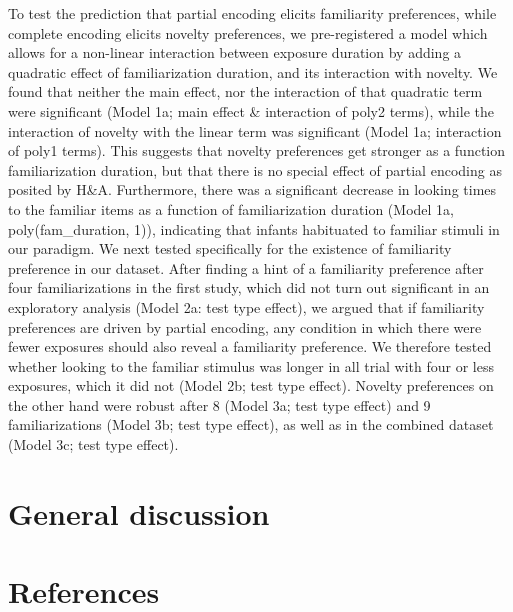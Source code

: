\documentclass[10pt, letterpaper]{article}
\begin{document}
To test the prediction that partial encoding elicits familiarity
preferences, while complete encoding elicits novelty preferences, we
pre-registered a model which allows for a non-linear interaction between
exposure duration by adding a quadratic effect of familiarization
duration, and its interaction with novelty. We found that neither the
main effect, nor the interaction of that quadratic term were significant
(Model 1a; main effect \& interaction of poly2 terms), while the
interaction of novelty with the linear term was significant (Model 1a;
interaction of poly1 terms). This suggests that novelty preferences get
stronger as a function familiarization duration, but that there is no
special effect of partial encoding as posited by H\&A. Furthermore,
there was a significant decrease in looking times to the familiar items
as a function of familiarization duration (Model 1a, poly(fam\_duration,
1)), indicating that infants habituated to familiar stimuli in our
paradigm. We next tested specifically for the existence of familiarity
preference in our dataset. After finding a hint of a familiarity
preference after four familiarizations in the first study, which did not
turn out significant in an exploratory analysis (Model 2a: test type
effect), we argued that if familiarity preferences are driven by partial
encoding, any condition in which there were fewer exposures should also
reveal a familiarity preference. We therefore tested whether looking to
the familiar stimulus was longer in all trial with four or less
exposures, which it did not (Model 2b; test type effect). Novelty
preferences on the other hand were robust after 8 (Model 3a; test type
effect) and 9 familiarizations (Model 3b; test type effect), as well as
in the combined dataset (Model 3c; test type effect).

\hypertarget{general-discussion}{%
\section{General discussion}\label{general-discussion}}

\hypertarget{references}{%
\section{References}\label{references}}

\setlength{\parindent}{-0.1in} 
\setlength{\leftskip}{0.125in}

\noindent


\end{document}
